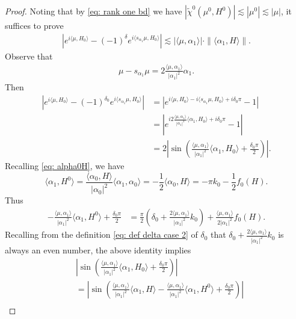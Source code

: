 \documentclass{amsart}
\numberwithin{equation}{section}
\numberwithin{equation}{section}
\begin{document}
\begin{proof}
Noting that by \eqref{eq: rank one bd} we have $|\widetilde{\chi}^0({\mu^0}, H^0)|\lesssim|\mu^0|\lesssim |\mu|$, it suffices to prove  
\begin{align}\label{eq: proving J1}
    \left|e^{i\langle \mu, H_{0}\rangle}-(-1)^\delta e^{i\langle s_{\alpha_1}\mu, H_{0}\rangle}\right|
    \lesssim |\langle\mu,\alpha_1\rangle |\cdot \|\langle\alpha_1,H\rangle\|.
\end{align}
Observe that 
\begin{align}\label{eq: simple difference}
    \mu-s_{\alpha_1}\mu=2\frac{\langle\mu,\alpha_1\rangle}{|\alpha_1|^2}\alpha_1.
\end{align}
Then 
\begin{align*}
  \left|e^{i\langle \mu, H_{0}\rangle}-(-1)^{\delta_0} e^{i\langle s_{\alpha_1}\mu, H_{0}\rangle}\right|
&=\left|e^{i\langle \mu, H_{0}\rangle-i\langle s_{\alpha_1}\mu, H_{0}\rangle+i{\delta_0}\pi }-1\right|\\
&=\left|e^{i2\frac{\langle\mu,\alpha_1\rangle}{|\alpha_1|^2}\langle \alpha_1, H_{0}\rangle+i{\delta_0}\pi }-1\right|\\
&=2\left|\sin\left(\frac{\langle\mu,\alpha_1\rangle}{|\alpha_1|^2}\langle \alpha_1, H_{0}\rangle+\frac{{\delta_0} \pi}{2}\right)\right|.
\end{align*}
Recalling \eqref{eq: alpha0H}, we have 
$$\langle\alpha_1,H^0\rangle=\frac{\langle\alpha_0, H\rangle}{|\alpha_0|^2}\langle\alpha_1,\alpha_0\rangle=-\frac{1}{2}\langle\alpha_0, H\rangle=-\pi k_0-\frac12 f_0(H).$$
Thus 
\begin{align*}
   -\frac{\langle\mu,\alpha_1\rangle}{|\alpha_1|^2}\langle \alpha_1, H^{0}\rangle+\frac{{\delta_0} \pi}{2}
    &=\frac{\pi}{2}\left({\delta_0}+ \frac{2\langle\mu,\alpha_1\rangle }{|\alpha_1|^2}k_0\right)+ \frac{\langle\mu,\alpha_1\rangle}{2|\alpha_1|^2}f_0(H).
\end{align*}
Recalling from the definition \eqref{eq: def delta case 2} of ${\delta_0}$ that 
${\delta_0}+ \frac{2\langle\mu,\alpha_1\rangle }{|\alpha_1|^2}k_0$ is always an even number, the above identity implies
\begin{align*}
    &\left|\sin\left(\frac{\langle\mu,\alpha_1\rangle}{|\alpha_1|^2}\langle \alpha_1, H_{0}\rangle+\frac{{\delta_0}\pi}{2}\right)\right|\\
    &=\left|\sin\left(\frac{\langle\mu,\alpha_1\rangle}{|\alpha_1|^2}\langle \alpha_1, H\rangle-  \frac{\langle\mu,\alpha_1\rangle}{|\alpha_1|^2}\langle \alpha_1, H^{0}\rangle +\frac{{\delta_0} \pi}{2}\right)\right|\\

\end{align*}
\end{proof}
\end{document}
